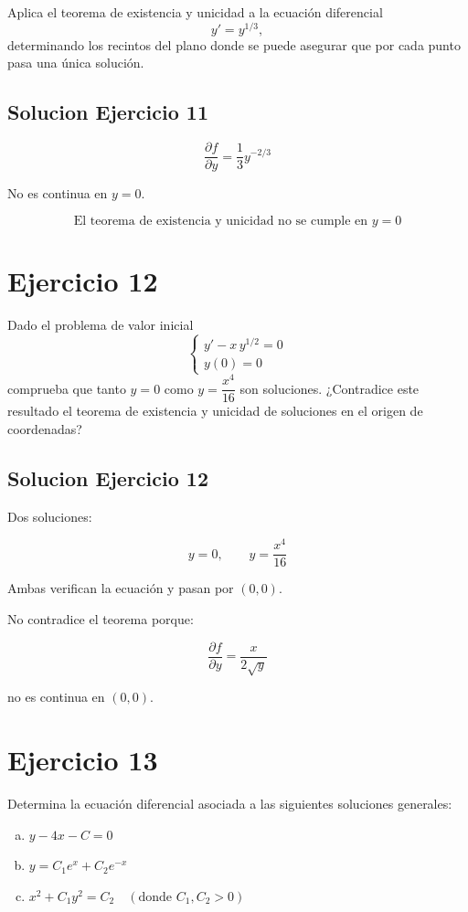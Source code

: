 \documentclass[12pt]{article}
\begin{document}
Aplica el teorema de existencia y unicidad a la ecuación diferencial
\[
y' = y^{1/3},
\]
determinando los recintos del plano donde se puede asegurar que por cada punto pasa una única solución.

\subsection*{Solucion Ejercicio 11}

\[
\frac{\partial f}{\partial y}=\frac{1}{3}y^{-2/3}
\]

No es continua en $y=0$.

\[
\boxed{\text{El teorema de existencia y unicidad no se cumple en } y=0}
\]

\section*{Ejercicio 12}

Dado el problema de valor inicial
\[
\begin{cases}
y' - x\, y^{1/2} = 0 \\
y(0) = 0
\end{cases}
\]
comprueba que tanto $y = 0$ como $y = \dfrac{x^4}{16}$ son soluciones.  
¿Contradice este resultado el teorema de existencia y unicidad de soluciones en el origen de coordenadas?

\subsection*{Solucion Ejercicio 12}

Dos soluciones:

\[
y=0,\qquad y=\frac{x^4}{16}
\]

Ambas verifican la ecuación y pasan por $(0,0)$.

No contradice el teorema porque:

\[
\frac{\partial f}{\partial y}=\frac{x}{2\sqrt{y}}
\]

no es continua en $(0,0)$.

\section*{Ejercicio 13}

Determina la ecuación diferencial asociada a las siguientes soluciones generales:

\begin{enumerate}[a)]
\item $y - 4x - C = 0$
\item $y = C_1 e^x + C_2 e^{-x}$
\item $x^2 + C_1 y^2 = C_2 \quad ( \text{donde } C_1, C_2 > 0 )$
\end{enumerate}
\end{document}
